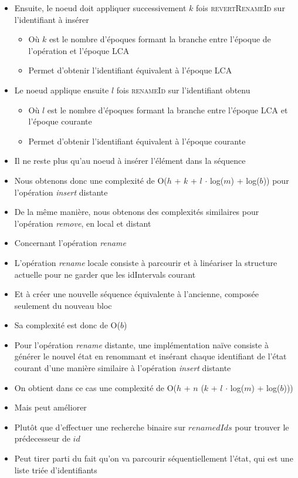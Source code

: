 \documentclass[12pt]{thesul}
\begin{document}
\begin{itemize}
  \item Ensuite, le noeud doit appliquer successivement $k$ fois \textsc{revertRenameId} sur l'identifiant à insérer
  \begin{itemize}
    \item Où $k$ est le nombre d'époques formant la branche entre l'époque de l'opération et l'époque \ac{LCA}
    \item Permet d'obtenir l'identifiant équivalent à l'époque \ac{LCA}
  \end{itemize}
  \item Le noeud applique ensuite $l$ fois \textsc{renameId} sur l'identifiant obtenu
  \begin{itemize}
    \item Où $l$ est le nombre d'époques formant la branche entre l'époque \ac{LCA} et l'époque courante
    \item Permet d'obtenir l'identifiant équivalent à l'époque courante
  \end{itemize}
  \item Il ne reste plus qu'au noeud à insérer l'élément dans la séquence
  \item Nous obtenons donc une complexité de O($h$ + $k$ + $l$ $\cdot$ log($m$) + log($b$)) pour l'opération \emph{insert} distante
  \item De la même manière, nous obtenons des complexités similaires pour l'opération \emph{remove}, en local et distant
  \item Concernant l'opération \emph{rename}
  \item L'opération \emph{rename} locale consiste à parcourir et à linéariser la structure actuelle pour ne garder que les idIntervals courant
  \item Et à créer une nouvelle séquence équivalente à l'ancienne, composée seulement du nouveau bloc
  \item Sa complexité est donc de O($b$)
  \item Pour l'opération \emph{rename} distante, une implémentation naïve consiste à générer le nouvel état en renommant et insérant chaque identifiant de l'état courant d'une manière similaire à l'opération \emph{insert} distante
  \item On obtient dans ce cas une complexité de O($h$ + $n$ ($k$ + $l$ $\cdot$ log($m$) + log($b$)))
  \item Mais peut améliorer
  \item Plutôt que d'effectuer une recherche binaire sur $renamedIds$ pour trouver le prédecesseur de $id$
  \item Peut tirer parti du fait qu'on va parcourir séquentiellement l'état, qui est une liste triée d'identifiants

\end{itemize}
\end{document}
